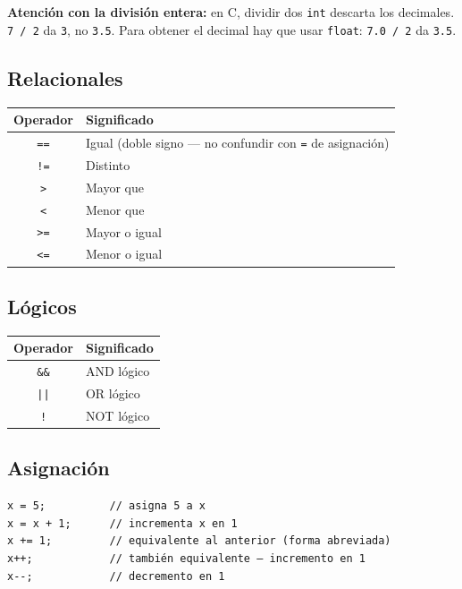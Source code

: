 \begin{advertenciabox}
\textbf{Atención con la división entera:} en C, dividir dos \texttt{int} descarta los decimales. \texttt{7 / 2} da \texttt{3}, no \texttt{3.5}. Para obtener el decimal hay que usar \texttt{float}: \texttt{7.0 / 2} da \texttt{3.5}.
\end{advertenciabox}

\subsection{Relacionales}

\begin{table}[H]
\centering
\begin{tabular}{cl}
\toprule
Operador & Significado \\
\midrule
\texttt{==} & Igual (doble signo --- no confundir con \texttt{=} de asignación) \\
\texttt{!=} & Distinto \\
\texttt{>} & Mayor que \\
\texttt{<} & Menor que \\
\texttt{>=} & Mayor o igual \\
\texttt{<=} & Menor o igual \\
\bottomrule
\end{tabular}
\end{table}

\subsection{Lógicos}

\begin{table}[H]
\centering
\begin{tabular}{cl}
\toprule
Operador & Significado \\
\midrule
\texttt{\&\&} & AND lógico \\
\texttt{||} & OR lógico \\
\texttt{!} & NOT lógico \\
\bottomrule
\end{tabular}
\end{table}

\subsection{Asignación}

\begin{lstlisting}[style=estilo-c]
x = 5;          // asigna 5 a x
x = x + 1;      // incrementa x en 1
x += 1;         // equivalente al anterior (forma abreviada)
x++;            // también equivalente — incremento en 1
x--;            // decremento en 1
\end{lstlisting}

